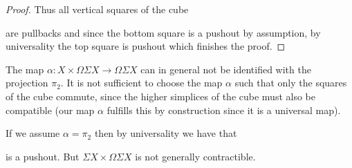 \begin{lemma}
\begin{proof}
        Thus all vertical squares of the cube
        \begin{center}
        \end{center}
        are pullbacks and since the bottom square is a pushout by assumption, by universality the top square is pushout which finishes the proof.
    \end{proof}
\end{lemma}
\begin{remark}\label{rmk:mapNotProj}
    The map $\alpha\colon X\times\Omega\Sigma X\to\Omega\Sigma X$ can in general not be identified with the projection $\pi_2$.
    It is not sufficient to choose the map $\alpha$ such that only the squares of the cube commute, since the higher simplices of the cube must also be compatible (our map $\alpha$ fulfills this by construction since it is a universal map).

    If we assume $\alpha=\pi_2$ then by universality we have that 
    \begin{center}
    \end{center}
    is a pushout.
    But $\Sigma X \times \Omega\Sigma X$ is not generally contractible. 
\end{remark}
